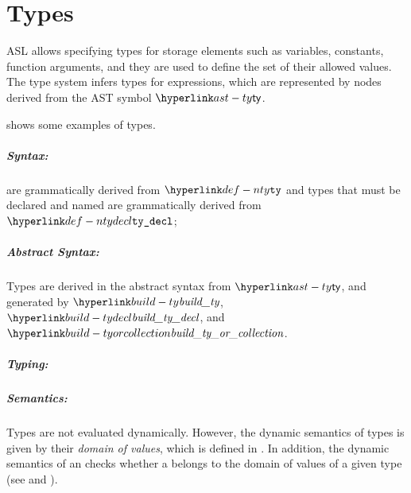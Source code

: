 \chapter{Types\label{chap:Types}}


ASL allows specifying types for storage elements such as variables, constants, function arguments,
and they are used to define the set of their allowed values.
%
The type system infers types for expressions, which are represented by \typedast{} nodes derived
from the AST symbol $\ty$.

 shows some examples of types.

\ChapterOutline

\paragraph{Syntax:} \Anonymoustypes{} are grammatically derived from $\Nty$
and types that must be declared and named are grammatically derived from $\Ntydecl$;

\paragraph{Abstract Syntax:} Types are derived in the abstract syntax from $\ty$,
  and generated by $\buildty$, $\buildtydecl$, and $\buildtyorcollection$.

\paragraph{Typing:}

\paragraph{Semantics:} Types are not evaluated dynamically.
  However, the dynamic semantics of types is given by their \emph{domain of values},
  which is defined in .
  In addition, the dynamic semantics of an \atcexpressionterm{}
  checks whether a \nativevalueterm{} belongs to the domain of values of a given type
  (see  and ).




